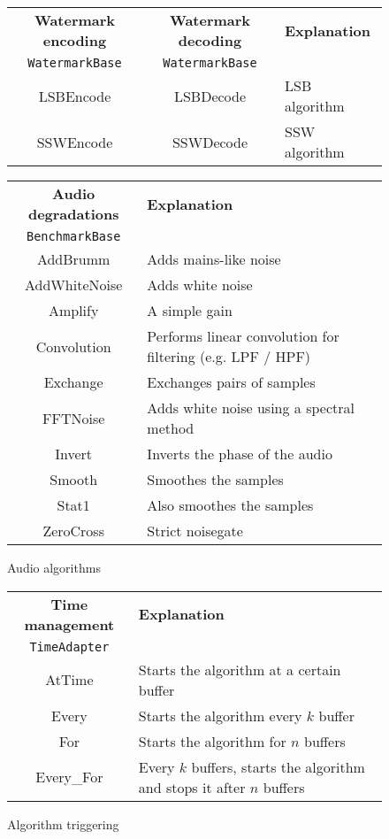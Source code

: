 \begin{figure}[ht!]
\centering
\begin{tabular}{|c|c|l|}
\hline
\textbf{Watermark encoding} & \textbf{Watermark decoding} & \textbf{Explanation} \\
\texttt{WatermarkBase} & \texttt{WatermarkBase} & \\
\hline
LSBEncode & LSBDecode & LSB algorithm \\
SSWEncode & SSWDecode & SSW algorithm \\
\hline
\end{tabular}

\vspace{1em}

\begin{tabular}{|c|l|}
\hline
\textbf{Audio degradations} & \textbf{Explanation} \\
\texttt{BenchmarkBase} & \\
\hline
AddBrumm & Adds mains-like noise \\
AddWhiteNoise & Adds white noise \\
Amplify & A simple gain \\
Convolution & Performs linear convolution for filtering (e.g. LPF / HPF)\\
Exchange & Exchanges pairs of samples \\
FFTNoise & Adds white noise using a spectral method \\
Invert & Inverts the phase of the audio \\
Smooth & Smoothes the samples \\ 
Stat1 & Also smoothes the samples \\
ZeroCross & Strict noisegate\\
\hline
\end{tabular} 
\caption{Audio algorithms}
\end{figure}

\begin{figure}[ht!]
\centering
\begin{tabular}{|c|l|}
\hline
\textbf{Time management} & \textbf{Explanation} \\
\texttt{TimeAdapter} & \\
\hline
AtTime & Starts the algorithm at a certain buffer \\
Every & Starts the algorithm every $k$ buffer \\
For & Starts the algorithm for $n$ buffers \\
Every\_For & Every $k$ buffers, starts the algorithm and stops it after $n$ buffers\\
\hline
\end{tabular}
\caption{Algorithm triggering}
\end{figure}

